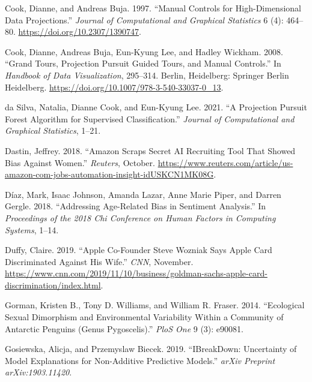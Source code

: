 \documentclass[
]{article}
\newlength{\cslhangindent}
\newlength{\cslentryspacingunit} %
\newenvironment{CSLReferences}[2] %
 {%
  \setlength{\parindent}{0pt}
  \ifodd #1
  \let\oldpar\par
  \def\par{\hangindent=\cslhangindent\oldpar}
  \fi
  \setlength{\parskip}{#2\cslentryspacingunit}
 }%
 {}
\begin{document}
\begin{CSLReferences}{1}{0}
\leavevmode{}%
Cook, Dianne, and Andreas Buja. 1997. {``Manual {Controls} for
{High}-{Dimensional} {Data} {Projections}.''} \emph{Journal of
Computational and Graphical Statistics} 6 (4): 464--80.
\url{https://doi.org/10.2307/1390747}.

\leavevmode{}%
Cook, Dianne, Andreas Buja, Eun-Kyung Lee, and Hadley Wickham. 2008.
{``Grand {Tours}, {Projection} {Pursuit} {Guided} {Tours}, and {Manual}
{Controls}.''} In \emph{Handbook of {Data} {Visualization}}, 295--314.
Berlin, Heidelberg: Springer Berlin Heidelberg.
\url{https://doi.org/10.1007/978-3-540-33037-0_13}.

\leavevmode{}%
da Silva, Natalia, Dianne Cook, and Eun-Kyung Lee. 2021. {``A
{Projection} {Pursuit} {Forest} {Algorithm} for {Supervised}
{Classification}.''} \emph{Journal of Computational and Graphical
Statistics}, 1--21.

\leavevmode{}%
Dastin, Jeffrey. 2018. {``Amazon Scraps Secret {AI} Recruiting Tool That
Showed Bias Against Women.''} \emph{Reuters}, October.
\url{https://www.reuters.com/article/us-amazon-com-jobs-automation-insight-idUSKCN1MK08G}.

\leavevmode{}%
Díaz, Mark, Isaac Johnson, Amanda Lazar, Anne Marie Piper, and Darren
Gergle. 2018. {``Addressing Age-Related Bias in Sentiment Analysis.''}
In \emph{Proceedings of the 2018 Chi Conference on Human Factors in
Computing Systems}, 1--14.

\leavevmode{}%
Duffy, Claire. 2019. {``Apple Co-Founder {Steve} {Wozniak} Says {Apple}
{Card} Discriminated Against His Wife.''} \emph{CNN}, November.
\url{https://www.cnn.com/2019/11/10/business/goldman-sachs-apple-card-discrimination/index.html}.

\leavevmode{}%
Gorman, Kristen B., Tony D. Williams, and William R. Fraser. 2014.
{``Ecological Sexual Dimorphism and Environmental Variability Within a
Community of {Antarctic} Penguins (Genus {Pygoscelis}).''} \emph{PloS
One} 9 (3): e90081.

\leavevmode{}%
Gosiewska, Alicja, and Przemyslaw Biecek. 2019. {``{IBreakDown}:
{Uncertainty} of Model Explanations for Non-Additive Predictive
Models.''} \emph{arXiv Preprint arXiv:1903.11420}.


\end{CSLReferences}
\end{document}
